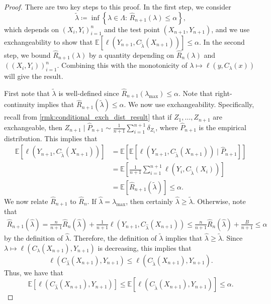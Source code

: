 \documentclass[11pt, titlepage]{article} %
\newcommand{\R}{\mathrm}
\newcommand{\Exp}[3]{\mathbb{E}\left#2 #1 \right#3}
\numberwithin{equation}{section}
\theoremstyle{definition}
\numberwithin{theorem}{section}
\numberwithin{lemma}{section}
\numberwithin{corollary}{section}
\numberwithin{proposition}{section}
\numberwithin{definition}{section}
\numberwithin{remark}{section}
\begin{document}
\begin{proof}
    There are two key steps to this proof. In the first step, we consider
    \[\tilde{\lambda} \coloneqq \inf \left\{ \lambda \in \Lambda: \, \hat{R}_{n+1}(\lambda) \leq \alpha \right\}, \] which depends on \((X_i, Y_i)_{i=1}^{n}\) and the test point \((X_{n+1}, Y_{n+1})\), and we use exchangeability to show that \(\Exp{\ell(Y_{n+1}, C_{\tilde{\lambda}}(X_{n+1}))}{[}{]} \leq \alpha\). In the second step, we bound \(\hat{R}_{n+1}(\lambda)\) by a quantity depending on \(\hat{R}_{n}(\lambda)\) and \(((X_i, Y_i))_{i=1}^n\). Combining this with the monotonicity of \(\lambda \mapsto \ell(y, C_\lambda(x))\) will give the result. \vskip5pt

    \noindent
    First note that \(\tilde{\lambda}\) is well-defined since
    \(\hat{R}_{n+1}(\lambda_{\R{max}}) \leq \alpha\). Note that right-continuity implies that \(\hat{R}_{n+1}(\tilde{\lambda}) \leq \alpha\). We now use exchangeability. Specifically, recall from \cref{rmk:conditional_exch_dist_result} that if \(Z_1, \ldots, Z_{n+1}\) are exchangeable, then \(Z_{n+1} \mid \hat{P}_{n+1} \sim \frac{1}{n+1} \sum_{i=1}^{n+1} \delta_{Z_i}\), where \(\hat{P}_{n+1}\) is the empirical distribution. This implies that \begin{align*}
        \Exp{\ell(Y_{n+1}, C_{\tilde{\lambda}}(X_{n+1}))}{[}{]} &= \Exp{\Exp{\ell(Y_{n+1}, C_{\tilde{\lambda}}(X_{n+1})) \mid \hat{P}_{n+1} }{[}{]}}{[}{]} \\
        &= \Exp{\frac{1}{n+1} \sum_{i=1}^{n+1} \ell(Y_{i}, C_{\tilde{\lambda}}(X_i))}{[}{]} \\
        &= \Exp{\hat{R}_{n+1}(\tilde{\lambda})}{[}{]} \leq \alpha.
    \end{align*}
    \noindent
    We now relate \(\hat{R}_{n+1}\) to \(\hat{R}_n\). If \(\hat{\lambda} = \lambda_\R{max}\), then certainly \(\hat{\lambda} \geq \tilde{\lambda}.\) Otherwise, note that \begin{align*}
    \hat{R}_{n+1}(\hat{\lambda}) = \frac{n}{n+1} \hat{R}_n(\hat{\lambda}) + \frac{1}{n+1} \ell(Y_{n+1}, C_{\hat{\lambda}}(X_{n+1})) \leq \frac{n}{n+1}\hat{R}_n(\hat{\lambda}) + \frac{B}{n+1} \leq \alpha
\end{align*} by the definition of \(\hat{\lambda}\). Therefore, the definition of \(\tilde{\lambda}\) implies that \(\hat{\lambda} \geq \tilde{\lambda}\). Since \(\lambda \mapsto \ell(C_\lambda (X_{n+1}), Y_{n+1})\) is decreasing, this implies that \[\ell(C_{\hat{\lambda}} (X_{n+1}), Y_{n+1}) \leq \ell(C_{\tilde{\lambda}} (X_{n+1}), Y_{n+1}).\] Thus, we have that \[\Exp{\ell(C_{\hat{\lambda}} (X_{n+1}), Y_{n+1})}{[}{]} \leq \Exp{\ell(C_{\tilde{\lambda}} (X_{n+1}), Y_{n+1})}{[}{]} \leq \alpha.\]
\end{proof}
\end{document}
